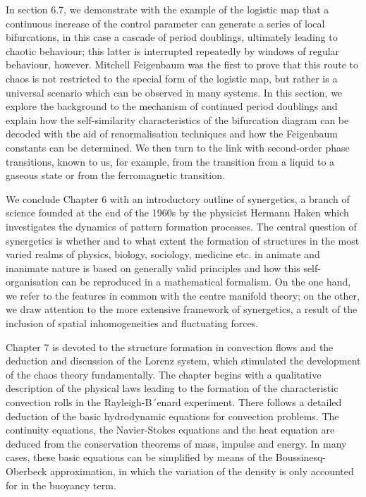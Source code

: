 \documentclass[12pt]{article}
\begin{document}
\hfill

In section 6.7, we demonstrate with the example of the logistic map that a continuous
increase of the control parameter can generate a series of local bifurcations,
in this case a cascade of period doublings, ultimately leading to chaotic behaviour;
this latter is interrupted repeatedly by windows of regular behaviour, however.
Mitchell Feigenbaum was the first to prove that this route to chaos is not restricted
to the special form of the logistic map, but rather is a universal scenario which
can be observed in many systems. In this section, we explore the background to
the mechanism of continued period doublings and explain how the self-similarity
characteristics of the bifurcation diagram can be decoded with the aid of renormalisation
techniques and how the Feigenbaum constants can be determined. We then
turn to the link with second-order phase transitions, known to us, for example, from
the transition from a liquid to a gaseous state or from the ferromagnetic transition.

\hfill

We conclude Chapter 6 with an introductory outline of synergetics, a branch of
science founded at the end of the 1960s by the physicist Hermann Haken which
investigates the dynamics of pattern formation processes. The central question of
synergetics is whether and to what extent the formation of structures in the most
varied realms of physics, biology, sociology, medicine etc. in animate and inanimate
nature is based on generally valid principles and how this self-organisation can be
reproduced in a mathematical formalism. On the one hand, we refer to the features
in common with the centre manifold theory; on the other, we draw attention to
the more extensive framework of synergetics, a result of the inclusion of spatial
inhomogeneities and fluctuating forces.

\hfill

Chapter 7 is devoted to the structure formation in convection flows and the deduction
and discussion of the Lorenz system, which stimulated the development of
the chaos theory fundamentally. The chapter begins with a qualitative description
of the physical laws leading to the formation of the characteristic convection rolls
in the Rayleigh-B´enard experiment. There follows a detailed deduction of the basic
hydrodynamic equations for convection problems. The continuity equations, the
Navier-Stokes equations and the heat equation are deduced from the conservation
theorems of mass, impulse and energy. In many cases, these basic equations can
be simplified by means of the Boussinesq-Oberbeck approximation, in which the
variation of the density is only accounted for in the buoyancy term.
\end{document}
